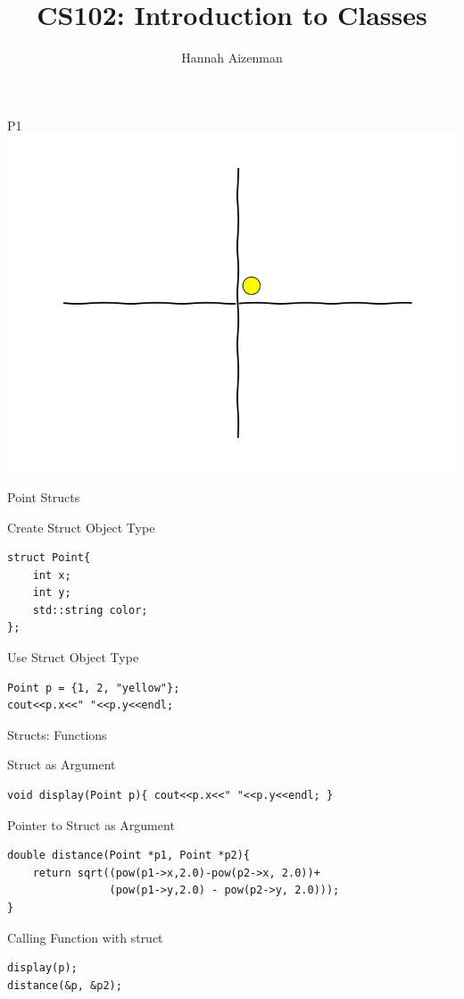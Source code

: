 \documentclass[xcolor={dvipsnames}]{beamer}
\begin{document}
\title{ CS102: Introduction to Classes}
\author{Hannah Aizenman}


\begin{frame}
	\titlepage
\end{frame}

\begin{frame}{P1}
	\includegraphics[width=1\textwidth]{traj000}
\end{frame}

\begin{frame}[fragile]{Point Structs}
\begin{block}{Create Struct Object Type}
\begin{verbatim}
struct Point{
    int x;
    int y;
    std::string color;
};
\end{verbatim}
\end{block}

\begin{block}{Use Struct Object Type}
\begin{verbatim}
Point p = {1, 2, "yellow"};
cout<<p.x<<" "<<p.y<<endl;
\end{verbatim}
\end{block}
\end{frame}

\begin{frame}[fragile]{Structs: Functions}
\begin{block}{Struct as Argument}
\begin{verbatim}
void display(Point p){ cout<<p.x<<" "<<p.y<<endl; }
\end{verbatim}
\end{block}
\begin{block}{Pointer to Struct as Argument}
\begin{verbatim}
double distance(Point *p1, Point *p2){
    return sqrt((pow(p1->x,2.0)-pow(p2->x, 2.0))+
                (pow(p1->y,2.0) - pow(p2->y, 2.0)));
}
\end{verbatim}
\begin{block}{Calling Function with struct}
\begin{verbatim}
display(p);
distance(&p, &p2);
\end{verbatim}
\end{block}
\end{block}
\end{frame}
\end{document}
